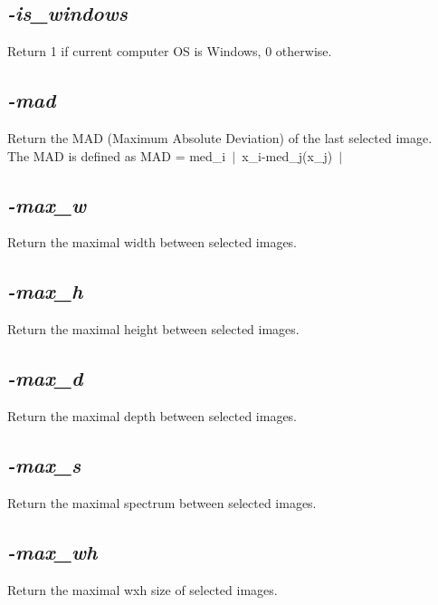 \documentclass[a4paper,11pt,twoside]{book}
\begin{document}
\subsection{\emph{-is\_windows} }\vspace*{-0.5em}
Return 1 if current computer OS is Windows, 0 otherwise.


\subsection{\emph{-mad} }\vspace*{-0.5em}
Return the MAD (Maximum Absolute Deviation) of the last selected image.
~\\The MAD is defined as MAD = med\_i~$|$~x\_i-med\_j(x\_j)~$|$~


\subsection{\emph{-max\_w} }\vspace*{-0.5em}
Return the maximal width between selected images.


\subsection{\emph{-max\_h} }\vspace*{-0.5em}
Return the maximal height between selected images.


\subsection{\emph{-max\_d} }\vspace*{-0.5em}
Return the maximal depth between selected images.


\subsection{\emph{-max\_s} }\vspace*{-0.5em}
Return the maximal spectrum between selected images.


\subsection{\emph{-max\_wh} }\vspace*{-0.5em}
Return the maximal wxh size of selected images.
\end{document}
